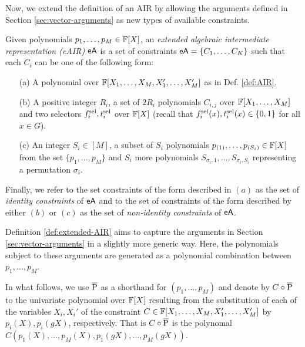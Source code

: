Now, we extend the definition of an AIR by allowing the arguments defined in Section \ref{sec:vector-arguments} as new types of available constraints.
\begin{definition}\label{def:extended-AIR}
  Given polynomials $p_1,\dots,p_M \in \mathbb{F}[X]$, an \textit{extended algebraic intermediate representation (eAIR)} $\textsf{eA}$ is a set of constraints $\textsf{eA} = \{C_1,\dots,C_K\}$ such that each $C_i$ can be one of the following form:
  \begin{enumerate}
    \item[(a)] A polynomial over $\mathbb{F}[X_1,\dots,X_M,X_1',\dots,X_M']$ as in Def. \ref{def:AIR}.
    \item[(b)] A positive integer $R_i$, a set of $2R_i$ polynomials $C_{i,j}$ over $\mathbb{F}[X_1,\dots,X_M]$ and two selectors $f^{\text{sel}}_i,t^{\text{sel}}_i$ over $\mathbb{F}[X]$ (recall that $f^{\text{sel}}_i(x),t^{\text{sel}}_i(x) \in \{0,1\}$ for all $x \in G$).
    \item[(c)] An integer $S_i \in [M]$, a subset of $S_i$ polynomials $p_{(1)},\dots,p_{(S_i)} \in \mathbb{F}[X]$ from the set $\{p_1,\dots,p_M\}$ and $S_i$ more polynomials $S_{\sigma_i, 1},\dots,S_{\sigma_i, S_i}$ representing a permutation $\sigma_i$.
  \end{enumerate}
Finally, we refer to the set constraints of the form described in $(a)$ as the set of \textit{identity constraints} of $\textsf{eA}$ and to the set of constraints of the form described by either $(b)$ or $(c)$ as the set of \textit{non-identity constraints} of $\textsf{eA}$.
\end{definition}
Definition \ref{def:extended-AIR} aims to capture the arguments in Section \ref{sec:vector-arguments} in a slightly more generic way. Here, the polynomials subject to these arguments are generated as a polynomial combination between $p_1,\dots,p_M$.

In what follows, we use $\overline{\text{P}}$ as a shorthand for $(p_1,\dots,p_M)$ and denote by $C \circ \overline{\text{P}}$ to the univariate polynomial over $\mathbb{F}[X]$ resulting from the substitution of each of the variables $X_i,X_i'$ of the constraint $C \in \mathbb{F}[X_1,\dots,X_M,X_1',\dots,X_M']$ by $p_i(X),p_i(gX)$, respectively. That is $C \circ \overline{\text{P}}$ is the polynomal $C(p_1(X),\dots,p_M(X),p_1(gX),\dots,p_M(gX))$.


